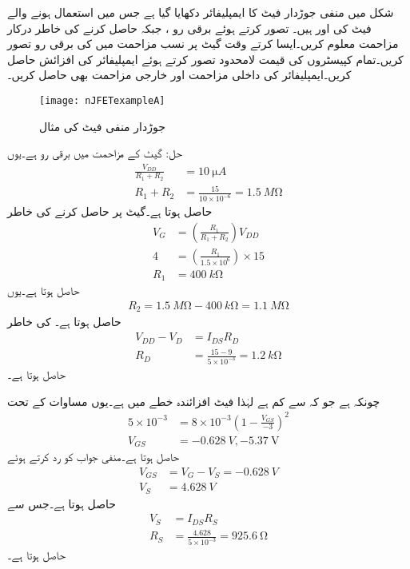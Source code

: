 شکل  میں منفی جوڑدار فیٹ کا ایمپلیفائر دکھایا گیا ہے جس میں استعمال ہونے والے فیٹ کی  اور  ہیں۔ تصور کرتے ہوئے برقی رو ،  جبکہ  حاصل کرنے کی خاطر درکار مزاحمت معلوم کریں۔ایسا کرتے وقت گیٹ پر نسب مزاحمت میں  کی برقی رو تصور کریں۔تمام کپیسٹروں کی قیمت لامحدود تصور کرتے ہوئے ایمپلیفائر کی افزائش  حاصل کریں۔ایمپلیفائر کی داخلی مزاحمت  اور خارجی مزاحمت  بھی حاصل کریں۔

\begin{figure}
\centering
\texttt{[image: nJFETexampleA]}
\caption{جوڑدار منفی فیٹ کی مثال}
\label{شکل_جوڑدار_منفی_فیٹ_مثال}
\end{figure}

حل:
گیٹ کے مزاحمت میں  برقی رو ہے۔یوں
\begin{align*}
\frac{V_{DD}}{R_1+R_2} &=\SI{10}{\micro A} \\
R_1+R_2&=\frac{15}{10 \times 10^{-6}}=\SI{1.5}{M \ohm}
\end{align*}
حاصل ہوتا ہے۔گیٹ پر  حاصل کرنے کی خاطر
\begin{align*}
V_G&=\left(\frac{R_1}{R_1+R_2} \right) V_{DD} \\
4&=\left(\frac{R_1}{1.5 \times 10^6}\right) \times 15 \\
R_1&=\SI{400}{k \ohm}
\end{align*}
حاصل ہوتا ہے۔یوں
\begin{align*}
R_2=\SI{1.5}{M \ohm}-\SI{400}{k \ohm}=\SI{1.1}{M \ohm}
\end{align*}
حاصل ہوتا ہے۔ کی خاطر
\begin{align*}
V_{DD}-V_D&=I_{DS} R_D \\
R_D &=\frac{15-9}{5 \times 10^{-3}}=\SI{1.2}{k \ohm}
\end{align*}
حاصل ہوتا ہے۔

چونکہ  ہے جو کہ  سے کم ہے لہٰذا فیٹ افزائندہ خطے میں ہے۔یوں مساوات  کے تحت
\begin{align*}
5 \times 10^{-3}&=8 \times 10^{-3} \left(1-\frac{V_{GS}}{-3} \right)^2 \\
V_{GS}&=\SI{-0.628}{V}, \SI{-5.37}{\volt}
\end{align*}
حاصل ہوتا ہے۔منفی جواب کو رد کرتے ہوئے
\begin{align*}
V_{GS}&=V_G-V_S=\SI{-0.628}{V} \\
V_S&=\SI{4.628}{V}
\end{align*}
حاصل ہوتا ہے۔جس سے
\begin{align*}
V_S &=I_{DS} R_S \\
R_S&=\frac{4.628}{5 \times 10^{-3}}=\SI{925.6}{\ohm}
\end{align*}
حاصل ہوتا ہے۔

